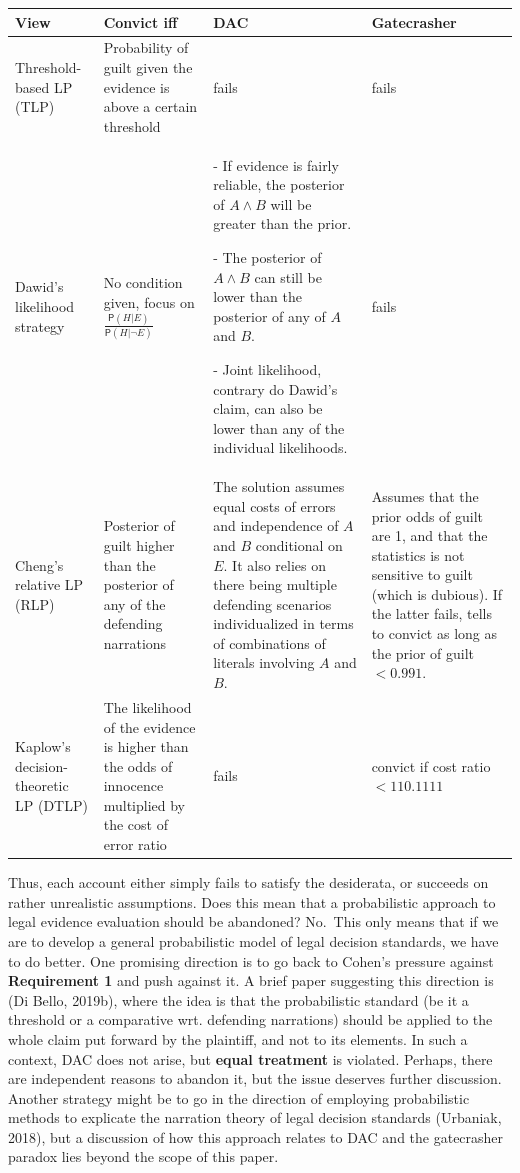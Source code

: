 \documentclass[10pt,dvipsnames,enabledeprecatedfontcommands]{scrartcl}
\newcommand{\n}{\neg}
\newcommand{\et}{\wedge}
\newcommand{\pr}[1]{\mathsf{P}(#1)}
\begin{document}
\begin{center}
\footnotesize 
 \begin{tabular}{@{}p{3cm}p{2.5cm}p{4cm}p{3cm}@{}}
\toprule
\textbf{View} & \textbf{Convict iff} & \textbf{DAC} & \textbf{Gatecrasher} \\ \midrule
Threshold-based LP (TLP) & Probability of guilt given the evidence is above a certain threshold & fails & fails \\
Dawid's likelihood strategy & No condition given, focus on $\frac{\pr{H\vert E}}{\pr{H\vert \n E}}$ & - If evidence is fairly reliable, the posterior of $A\et B$ will be greater than the prior.

- The posterior of $A\et B$ can still be lower than the posterior of any of $A$ and $B$.

- Joint likelihood, contrary do Dawid's claim, can also be lower than any of the individual likelihoods. & fails  \\
Cheng's relative LP (RLP)
& Posterior of guilt higher than the posterior of any of the defending narrations & The solution assumes equal costs of errors and independence of $A$ and $B$ conditional on $E$. It also relies on there being multiple defending scenarios individualized in terms of  combinations of literals involving $A$ and $B$. & Assumes that the prior odds of guilt are 1, and that the statistics is not sensitive to guilt (which is dubious). If the latter fails, tells to convict as long as the prior of guilt $<0.991$. \\
Kaplow's decision-theoretic LP (DTLP) &
The likelihood of the evidence is higher than the odds of innocence multiplied by the cost of error ratio & fails & convict if cost ratio $<110.1111$
\end{tabular} 
 \end{center}

Thus, each account either simply fails to satisfy the desiderata, or
succeeds on rather unrealistic assumptions. Does this mean that a
probabilistic approach to legal evidence evaluation should be abandoned?
No.~This only means that if we are to develop a general probabilistic
model of legal decision standards, we have to do better. One promising
direction is to go back to Cohen's pressure against
\textbf{Requirement 1} and push against it. A brief paper suggesting
this direction is (Di Bello, 2019b), where the idea is that the
probabilistic standard (be it a threshold or a comparative wrt.
defending narrations) should be applied to the whole claim put forward
by the plaintiff, and not to its elements. In such a context, DAC does
not arise, but \textbf{equal treatment} is violated. Perhaps, there are
independent reasons to abandon it, but the issue deserves further
discussion. Another strategy might be to go in the direction of
employing probabilistic methods to explicate the narration theory of
legal decision standards (Urbaniak, 2018), but a discussion of how this
approach relates to DAC and the gatecrasher paradox lies beyond the
scope of this paper.
\end{document}
